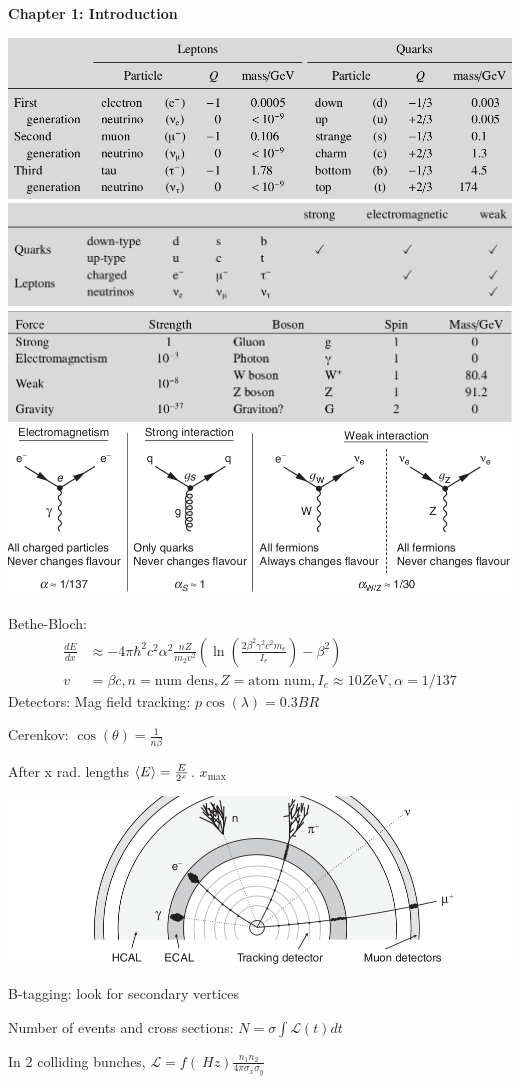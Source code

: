 \textbf{Chapter 1: Introduction}
\begin{center}
    \includegraphics[width=\linewidth]{images/quark_info.png}
    \includegraphics[width=\linewidth]{images/which_forces_for_which_particles.png}
    \includegraphics[width=\linewidth]{images/boson_info.png}
    \includegraphics[width=\linewidth]{images/interaction_basics.png}
\end{center}
Bethe-Bloch:
\begin{align*}
    \frac{dE}{dx} &\approx -4\pi\hbar^2 c^2 \alpha^2 \frac{nZ}{m_2v^2}\left(\ln\left(\frac{2\beta^2\gamma^2c^2m_e}{I_e}\right) - \beta^2\right)\\
    v &= \beta c, n = \text{num dens}, Z=\text{atom num}, I_e \approx 10Z\text{eV}, \alpha = 1/137
\end{align*}
Detectors:
Mag field tracking: $p\cos(\lambda) = 0.3BR$

Cerenkov: $\cos(\theta) = \frac{1}{n\beta}$

After x rad. lengths $\expval{E} = \frac{E}{2^x}$. $x_{\text{max}}$
\begin{center}
    \includegraphics[width=\linewidth]{images/particle_tracks.png}
\end{center}
B-tagging: look for secondary vertices

Number of events and cross sections: $N = \sigma\int \mathcal{L}(t)dt$

In 2 colliding bunches, $\mathcal{L} = f(\SI{}{Hz}) \frac{n_1 n_2}{4\pi \sigma_x \sigma_y}$
